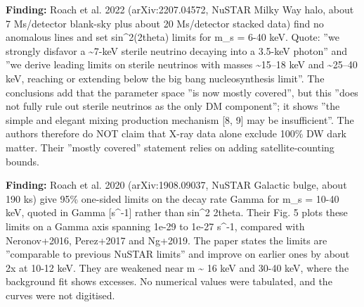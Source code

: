 \documentclass[11pt,a4paper]{article}
\begin{document}
\textbf{Finding:} Roach et al. 2022 (arXiv:2207.04572, NuSTAR Milky Way halo, about 7 Ms/detector blank-sky plus about 20 Ms/detector stacked data) find no anomalous lines and set sin\textasciicircum{}2(2theta) limits for m\_s = 6-40 keV. Quote: ''we strongly disfavor a \textasciitilde{}7-keV sterile neutrino decaying into a 3.5-keV photon'' and ''we derive leading limits on sterile neutrinos with masses \textasciitilde{}15--18 keV and \textasciitilde{}25--40 keV, reaching or extending below the big bang nucleosynthesis limit''. The conclusions add that the parameter space ''is now mostly covered'', but this ''does not fully rule out sterile neutrinos as the only DM component''; it shows ''the simple and elegant mixing production mechanism [8, 9] may be insufficient''. The authors therefore do NOT claim that X-ray data alone exclude 100\% DW dark matter. Their ''mostly covered'' statement relies on adding satellite-counting bounds.

\textbf{Finding:} Roach et al. 2020 (arXiv:1908.09037, NuSTAR Galactic bulge, about 190 ks) give 95\% one-sided limits on the decay rate Gamma for m\_s = 10-40 keV, quoted in Gamma [s\textasciicircum{}-1] rather than sin\textasciicircum{}2 2theta. Their Fig. 5 plots these limits on a Gamma axis spanning 1e-29 to 1e-27 s\textasciicircum{}-1, compared with Neronov+2016, Perez+2017 and Ng+2019. The paper states the limits are ''comparable to previous NuSTAR limits'' and improve on earlier ones by about 2x at 10-12 keV. They are weakened near m \textasciitilde{} 16 keV and 30-40 keV, where the background fit shows excesses. No numerical values were tabulated, and the curves were not digitised.
\end{document}
